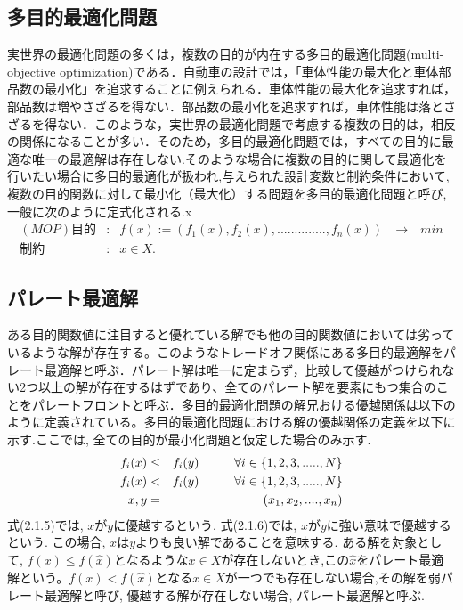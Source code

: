 \documentclass[11pt,a4j,notitlepage]{jreport}
\begin{document}
\subsection{多目的最適化問題}
実世界の最適化問題の多くは，複数の目的が内在する多目的最適化問題(multi-objective optimization)である．自動車の設計では，「車体性能の最大化と車体部品数の最小化」を追求することに例えられる．車体性能の最大化を追求すれば，部品数は増やさざるを得ない．部品数の最小化を追求すれば，車体性能は落とさざるを得ない．このような，実世界の最適化問題で考慮する複数の目的は，相反の関係になることが多い．そのため，多目的最適化問題では，すべての目的に最適な唯一の最適解は存在しない.そのような場合に複数の目的に関して最適化を行いたい場合に多目的最適化が扱われ,与えられた設計変数と制約条件において,複数の目的関数に対して最小化（最大化）する問題を多目的最適化問題と呼び,一般に次のように定式化される.x
\begin{eqnarray}
(MOP)         \mbox{目的}&:& f(x):=(f_1(x),f_2(x),..............,f_n(x))\mbox{　→　}min\\
         \mbox{制約}&:&x    \in  X.
\end{eqnarray}
 
\subsection{パレート最適解}
ある目的関数値に注目すると優れている解でも他の目的関数値においては劣っているような解が存在する。このようなトレードオフ関係にある多目的最適解をパレート最適解と呼ぶ．パレート解は唯一に定まらず，比較して優越がつけられない2つ以上の解が存在するはずであり、全てのパレート解を要素にもつ集合のことをパレートフロントと呼ぶ．多目的最適化問題の解兄おける優越関係は以下のように定義されている。多目的最適化問題における解の優越関係の定義を以下に示す.ここでは, 全ての目的が最小化問題と仮定した場合のみ示す.
\begin{eqnarray}
        f_i(x) &\leq & f_i(y)    \hspace{10mm}  \forall i \in \{1,2,3,.....,N\} \\
        f_i(x) & < & f_i(y)       \hspace{10mm} \forall i \in \{1,2,3,.....,N\} \\
        x,y &=& (x_1,x_2,....,x_n)
\end{eqnarray}
式(2.1.5)では, $x$が$y$に優越するという.
式(2.1.6)では, $x$が$y$に強い意味で優越するという.
この場合, $x$は$y$よりも良い解であることを意味する.
ある解を対象として, $f(x) \leq f(\hat{x})$となるような$x \in X$が存在しないとき,この$\hat{x}$をパレート最適解という。$f(x) < f(\hat{x})$となる$x \in X$が一つでも存在しない場合,その解を弱パレート最適解と呼び, 優越する解が存在しない場合, パレート最適解と呼ぶ.
\end{document}

